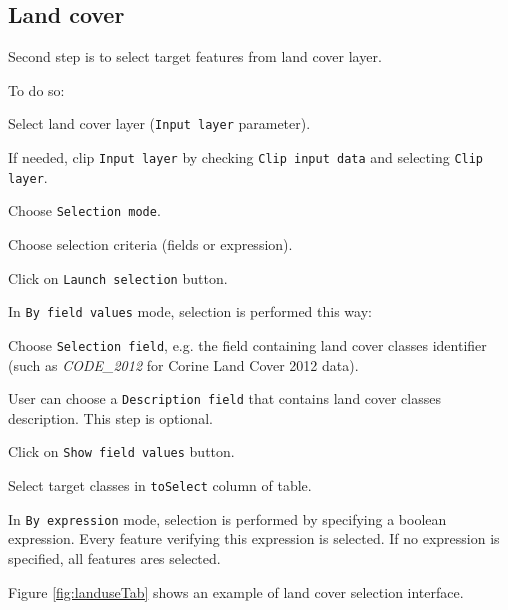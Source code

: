 \documentclass[11pt]{article}
\let\tempone\itemize
\let\temptwo\enditemize
\renewenvironment{itemize}{\tempone\addtolength{\itemsep}{-0.5\baselineskip}}{\temptwo}
\renewenvironment{enumerate}{\tempone\addtolength{\itemsep}{-0.5\baselineskip}}{\temptwo}
\begin{document}
\pagebreak

\subsection{Land cover}

Second step is to select target features from land cover layer.

To do so:
\begin{enumerate}
    \item Select land cover layer (\texttt{Input layer} parameter).
    \item If needed, clip \texttt{Input layer} by checking \texttt{Clip input data} and selecting \texttt{Clip layer}.
    \item Choose \texttt{Selection mode}.
    \item Choose selection criteria (fields or expression).
    \item Click on \texttt{Launch selection} button.
\end{enumerate}

In \texttt{By field values} mode, selection is performed this way:
\begin{itemize}
    \item Choose \texttt{Selection field}, e.g. the field containing land cover classes identifier (such as \textit{CODE\_2012} for Corine Land Cover 2012 data).
    \item User can choose a \texttt{Description field} that contains land cover classes description. This step is optional.
    \item Click on \texttt{Show field values} button.
    \item Select target classes in \texttt{toSelect} column of table.
\end{itemize}

In \texttt{By expression} mode, selection is performed by specifying a boolean expression. Every feature verifying this expression is selected. If no expression is specified, all features ares selected.

Figure \ref{fig:landuseTab} shows an example of land cover selection interface.
\end{document}
